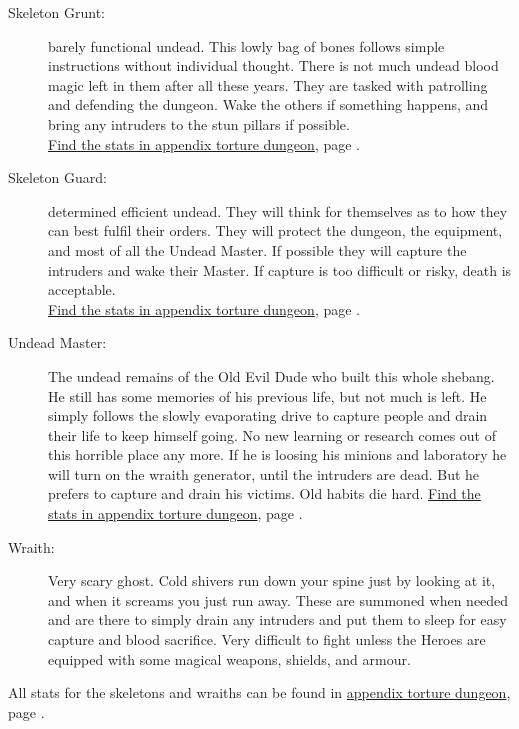 \begin{description}

\item[Skeleton Grunt:] barely functional undead. This lowly bag of bones follows simple instructions without individual thought. There is not much undead blood magic left in them after all these years. They are tasked with patrolling and defending the dungeon. Wake the others if something happens, and bring any intruders to the stun pillars if possible.\\
\hyperref[skeletongrunt]{Find the stats in appendix torture dungeon}, page \pageref{skeletongrunt}.

\item[Skeleton Guard:] determined efficient undead. They will think for themselves as to how they can best fulfil their orders. They will protect the dungeon, the equipment, and most of all the Undead Master. If possible they will capture the intruders and wake their Master. If capture is too difficult or risky, death is acceptable.\\
\hyperref[skeletonguard]{Find the stats in appendix torture dungeon}, page \pageref{skeletonguard}.

\item[Undead Master:] The undead remains of the Old Evil Dude who built this whole shebang. He still has some memories of his previous life, but not much is left. He simply follows the slowly evaporating drive to capture people and drain their life to keep himself going. No new learning or research comes out of this horrible place any more. If he is loosing his minions and laboratory he will turn on the wraith generator, until the intruders are dead. But he prefers to capture and drain his victims. Old habits die hard.
\hyperref[skeletonmaster]{Find the stats in appendix torture dungeon}, page \pageref{skeletonmaster}.

\item[Wraith:] Very scary ghost. Cold shivers run down your spine just by looking at it, and when it screams you just run away. These are summoned when needed and are there to simply drain any intruders and put them to sleep for easy capture and blood sacrifice. Very difficult to fight unless the Heroes are equipped with some magical weapons, shields, and armour.

\end{description}

\noindent All stats for the skeletons and wraiths can be found in \hyperref[appendixtorturedungeon]{appendix torture dungeon}, page \pageref{appendixtorturedungeon}.



